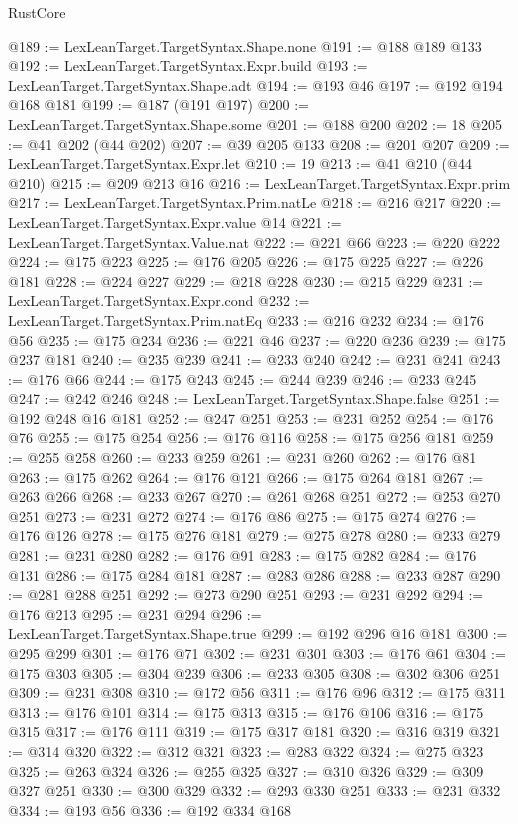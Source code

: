 \begin{lexlean}{RustCore}
\begin{coremodule}
@189 := LexLeanTarget.TargetSyntax.Shape.none
@191 := @188 @189 @133
@192 := LexLeanTarget.TargetSyntax.Expr.build
@193 := LexLeanTarget.TargetSyntax.Shape.adt
@194 := @193 @46
@197 := @192 @194 @168 @181
@199 := @187 (@191 @197)
@200 := LexLeanTarget.TargetSyntax.Shape.some
@201 := @188 @200
@202 := 18
@205 := @41 @202 (@44 @202)
@207 := @39 @205 @133
@208 := @201 @207
@209 := LexLeanTarget.TargetSyntax.Expr.let
@210 := 19
@213 := @41 @210 (@44 @210)
@215 := @209 @213 @16
@216 := LexLeanTarget.TargetSyntax.Expr.prim
@217 := LexLeanTarget.TargetSyntax.Prim.natLe
@218 := @216 @217
@220 := LexLeanTarget.TargetSyntax.Expr.value @14
@221 := LexLeanTarget.TargetSyntax.Value.nat
@222 := @221 @66
@223 := @220 @222
@224 := @175 @223
@225 := @176 @205
@226 := @175 @225
@227 := @226 @181
@228 := @224 @227
@229 := @218 @228
@230 := @215 @229
@231 := LexLeanTarget.TargetSyntax.Expr.cond
@232 := LexLeanTarget.TargetSyntax.Prim.natEq
@233 := @216 @232
@234 := @176 @56
@235 := @175 @234
@236 := @221 @46
@237 := @220 @236
@239 := @175 @237 @181
@240 := @235 @239
@241 := @233 @240
@242 := @231 @241
@243 := @176 @66
@244 := @175 @243
@245 := @244 @239
@246 := @233 @245
@247 := @242 @246
@248 := LexLeanTarget.TargetSyntax.Shape.false
@251 := @192 @248 @16 @181
@252 := @247 @251
@253 := @231 @252
@254 := @176 @76
@255 := @175 @254
@256 := @176 @116
@258 := @175 @256 @181
@259 := @255 @258
@260 := @233 @259
@261 := @231 @260
@262 := @176 @81
@263 := @175 @262
@264 := @176 @121
@266 := @175 @264 @181
@267 := @263 @266
@268 := @233 @267
@270 := @261 @268 @251
@272 := @253 @270 @251
@273 := @231 @272
@274 := @176 @86
@275 := @175 @274
@276 := @176 @126
@278 := @175 @276 @181
@279 := @275 @278
@280 := @233 @279
@281 := @231 @280
@282 := @176 @91
@283 := @175 @282
@284 := @176 @131
@286 := @175 @284 @181
@287 := @283 @286
@288 := @233 @287
@290 := @281 @288 @251
@292 := @273 @290 @251
@293 := @231 @292
@294 := @176 @213
@295 := @231 @294
@296 := LexLeanTarget.TargetSyntax.Shape.true
@299 := @192 @296 @16 @181
@300 := @295 @299
@301 := @176 @71
@302 := @231 @301
@303 := @176 @61
@304 := @175 @303
@305 := @304 @239
@306 := @233 @305
@308 := @302 @306 @251
@309 := @231 @308
@310 := @172 @56
@311 := @176 @96
@312 := @175 @311
@313 := @176 @101
@314 := @175 @313
@315 := @176 @106
@316 := @175 @315
@317 := @176 @111
@319 := @175 @317 @181
@320 := @316 @319
@321 := @314 @320
@322 := @312 @321
@323 := @283 @322
@324 := @275 @323
@325 := @263 @324
@326 := @255 @325
@327 := @310 @326
@329 := @309 @327 @251
@330 := @300 @329
@332 := @293 @330 @251
@333 := @231 @332
@334 := @193 @56
@336 := @192 @334 @168

\end{coremodule}
\end{lexlean}
